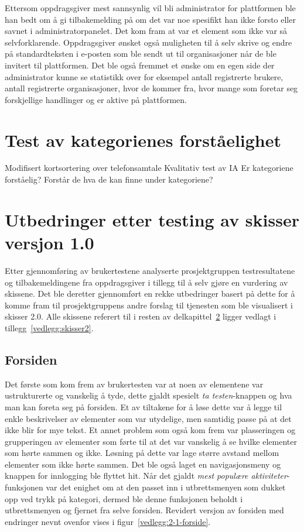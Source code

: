 Ettersom oppdragsgiver mest sannsynlig vil bli administrator for plattformen ble han bedt om å gi tilbakemelding på om det var noe spesifikt han ikke forsto eller savnet i administratorpanelet. Det kom fram at  var et element som ikke var så selvforklarende. Oppdragsgiver ønsket også muligheten til å selv skrive og endre på standardteksten i e-posten som ble sendt ut til organisasjoner når de ble invitert til plattformen. Det ble også fremmet et ønske om en egen side der administrator kunne se statistikk over for eksempel antall registrerte brukere, antall registrerte organisasjoner, hvor de kommer fra, hvor mange som foretar seg forskjellige handlinger og er aktive på plattformen.

\section{Test av kategorienes forståelighet}
Modifisert kortsortering over telefonsamtale
Kvalitativ test av IA
Er kategoriene forståelig? Forstår de hva de kan finne under kategoriene?

\section{Utbedringer etter testing av skisser versjon 1.0}
\label{section:utbedringer-skisser-1}
Etter gjennomføring av brukertestene analyserte prosjektgruppen testresultatene og tilbakemeldingene fra oppdragsgiver i tillegg til å selv gjøre en vurdering av skissene. Det ble deretter gjennomført en rekke utbedringer basert på dette for å komme fram til prosjektgruppens andre forslag til tjenesten som ble visualisert i skisser 2.0. Alle skissene referert til i resten av delkapittel~\ref{section:utbedringer-skisser-1} ligger vedlagt i tillegg~\ref{vedlegg:skisser2}.

\subsection{Forsiden}

Det første som kom frem av brukertesten var at noen av elementene var ustrukturerte og vanskelig å tyde, dette gjaldt spesielt {\em ta testen}-knappen og hva man kan foreta seg på forsiden. Et av tiltakene for å løse dette var å legge til enkle beskrivelser av elementer som var utydelige, men samtidig passe på at det ikke blir for mye tekst. Et annet problem som også kom frem var plasseringen og grupperingen av elementer som førte til at det var vanskelig å se hvilke elementer som hørte sammen og ikke. Løsning på dette var lage større avstand mellom elementer som ikke hørte sammen. Det ble også laget en navigasjonsmeny og knappen for innlogging ble flyttet hit. Når det gjaldt {\em mest populære aktiviteter}-funksjonen var det enighet om at den passet inn i utbrettsmenyen som dukket opp ved trykk på kategori, dermed ble denne funksjonen beholdt i utbrettsmenyen og fjernet fra selve forsiden. Revidert versjon av forsiden med endringer nevnt ovenfor vises i figur~\ref{vedlegg:2-1-forside}.

